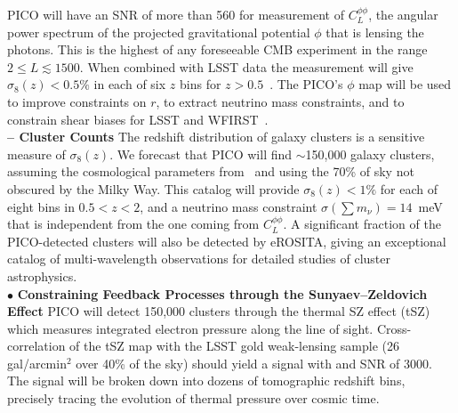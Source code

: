 \documentclass[PICOAPC.tex]{subfiles}
\begin{document}
PICO will have an \ac{SNR} of more than 560 for measurement of $C_{L}^{\phi \phi}$, the angular power spectrum of the projected gravitational potential $\phi$ that is lensing the photons. This is the highest of any foreseeable CMB experiment in the range $2 \leq L \lesssim 1500$. When combined with LSST data the measurement will give $\sigma_8(z) <0.5\%$ in each of six $z$ bins for $z>0.5$~\cite{pico_report}. The PICO's $\phi$ map will be used to improve constraints on $r$, to extract neutrino mass constraints, and to constrain shear biases for LSST and WFIRST~\citep{schaan_etal2019}.\\
%
{\bf -- Cluster Counts} \hspace{0.1in} \label{clusters}  
The redshift distribution of galaxy clusters is a sensitive measure of $\sigma_{8}(z)$. We forecast that PICO will find $\sim$150,000 galaxy clusters, assuming the cosmological parameters from \planck\  and using the 70\% of sky not obscured by the Milky Way.  
This catalog will provide $\sigma_{8}(z) < 1\%$ for each of eight bins in $0.5 < z < 2$, and a neutrino mass constraint $\sigma(\sum m_{\nu}) = 14$~meV that is independent from the one coming from $C_{L}^{\phi \phi}$. A significant fraction of the PICO-detected clusters will also be detected by eROSITA, giving an exceptional catalog of multi-wavelength observations for detailed studies of cluster astrophysics. \\
%
$\bullet$ {\bf Constraining Feedback Processes through the Sunyaev--Zeldovich Effect} \hspace{0.1in} \label{sec:sz}
PICO will detect 150,000 clusters through the thermal SZ effect (tSZ) which measures integrated electron pressure along the line of sight.  Cross-correlation of the tSZ map with the LSST gold weak-lensing sample (26 gal/arcmin$^2$ over 40\% of the sky) should yield a signal with and \ac{SNR} of 3000.  The signal will be broken down into dozens of tomographic redshift bins, precisely tracing the evolution of thermal pressure over cosmic time.
\end{document}
